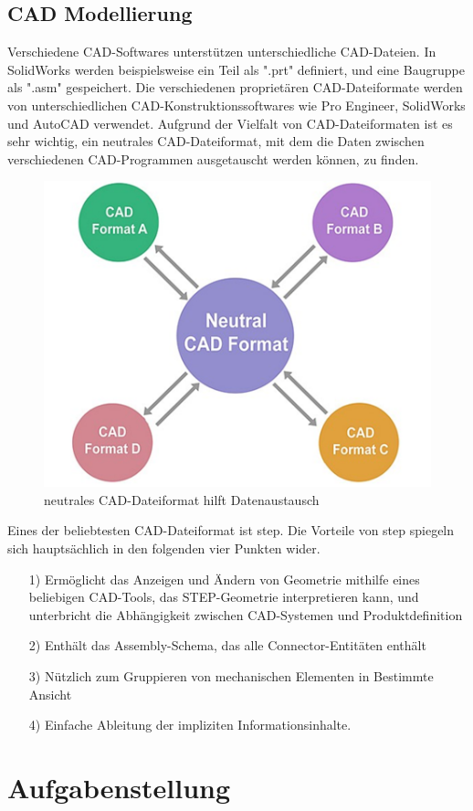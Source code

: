 \documentclass[14pt,a4paper,titlepage]{article}
\begin{document}
	\subsection{CAD Modellierung}
		Verschiedene CAD-Softwares unterstützen unterschiedliche CAD-Dateien. In SolidWorks werden beispielsweise ein Teil als ".prt" definiert, und eine Baugruppe als ".asm" gespeichert. Die verschiedenen proprietären CAD-Dateiformate werden von unterschiedlichen CAD-Konstruktionssoftwares wie Pro Engineer, SolidWorks und AutoCAD verwendet. Aufgrund der Vielfalt von CAD-Dateiformaten ist es sehr wichtig, ein neutrales CAD-Dateiformat, mit dem die Daten zwischen verschiedenen CAD-Programmen ausgetauscht werden können, zu finden.
		\begin{figure}[h!]
			\centering
			\includegraphics[width=0.5\linewidth]{cad.png}
			\caption{neutrales CAD-Dateiformat hilft Datenaustausch}
			\label{fig7}
		\end{figure}
		\break
		Eines der beliebtesten CAD-Dateiformat ist \acs{step}. Die Vorteile von \acs{step} spiegeln sich hauptsächlich in den folgenden vier Punkten wider.
		\begin{itemize}
			\item[1)]
			Ermöglicht das Anzeigen und Ändern von Geometrie mithilfe eines beliebigen CAD-Tools, das STEP-Geometrie interpretieren kann, und unterbricht die Abhängigkeit zwischen CAD-Systemen und Produktdefinition
			\item[2)] 
			Enthält das Assembly-Schema, das alle Connector-Entitäten enthält
			\item[3)] 
			Nützlich zum Gruppieren von mechanischen Elementen in Bestimmte Ansicht
			\item[4)] 
			Einfache Ableitung der impliziten Informationsinhalte. 
		\end{itemize}  
	\pagebreak
	\section{Aufgabenstellung}
\end{document}
